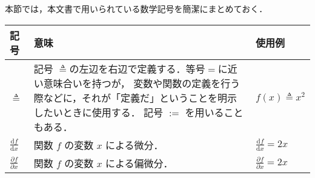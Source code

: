 %


本節では，本文書で用いられている数学記号を簡潔にまとめておく．

\begin{table*}[b]
\begin{center}
\begin{tabular}{p{30pt}p{350pt}p{100pt}}
    \hline
    記号 & 意味 & 使用例 \\
    \hline
    $\triangleq$ &
    記号 $\triangleq$の左辺を右辺で定義する．等号$=$に近い意味合いを持つが，
    変数や関数の定義を行う際などに，それが「定義だ」ということを明示したいときに使用する．
    記号 $:=$ を用いることもある． &
    $f(x) \triangleq x^2$ \\
    $\frac{\mathrm{d} f}{\mathrm{d} x}$ &
    関数 $f$ の変数 $x$ による微分．&
    $\frac{\mathrm{d} f}{\mathrm{d} x} = 2 x$ \\
    $\frac{\partial f}{\partial x}$ &
    関数 $f$ の変数 $x$ による偏微分．&
    $\frac{\partial f}{\partial x} = 2 x$ \\
    \hline
\end{tabular}
\end{center}
\end{table*}


